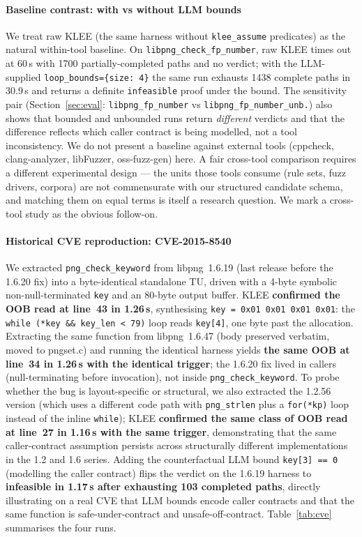 \documentclass[3p,times,procedia]{elsarticle}
\begin{document}
\paragraph{Baseline contrast: with vs without LLM bounds} We treat raw KLEE (the same harness without \texttt{klee\_assume} predicates) as the natural within-tool baseline. On \texttt{libpng\_check\_fp\_number}, raw KLEE times out at 60\,s with 1700 partially-completed paths and no verdict; with the LLM-supplied \texttt{loop\_bounds=\{size: 4\}} the same run exhausts 1438 complete paths in 30.9\,s and returns a definite \texttt{infeasible} proof under the bound. The sensitivity pair (Section~\ref{sec:eval}: \texttt{libpng\_fp\_number} vs \texttt{libpng\_fp\_number\_unb.}) also shows that bounded and unbounded runs return \emph{different} verdicts and that the difference reflects which caller contract is being modelled, not a tool inconsistency. We do not present a baseline against external tools (cppcheck, clang-analyzer, libFuzzer, oss-fuzz-gen) here. A fair cross-tool comparison requires a different experimental design --- the units those tools consume (rule sets, fuzz drivers, corpora) are not commensurate with our structured candidate schema, and matching them on equal terms is itself a research question. We mark a cross-tool study as the obvious follow-on.

\paragraph{Historical CVE reproduction: CVE-2015-8540 \cite{cve20158540}} We extracted \texttt{png\_check\_keyword} from libpng~1.6.19 (last release before the 1.6.20 fix) into a byte-identical standalone TU, driven with a 4-byte symbolic non-null-terminated \texttt{key} and an 80-byte output buffer. KLEE \textbf{confirmed the OOB read at line~43 in 1.26\,s}, synthesising \texttt{key = 0x01\,0x01\,0x01\,0x01}: the \texttt{while (*key \&\& key\_len < 79)} loop reads \texttt{key[4]}, one byte past the allocation. Extracting the same function from libpng~1.6.47 (body preserved verbatim, moved to pngset.c) and running the identical harness yields \textbf{the same OOB at line~34 in 1.26\,s with the identical trigger}; the 1.6.20 fix lived in callers (null-terminating before invocation), not inside \texttt{png\_check\_keyword}. To probe whether the bug is layout-specific or structural, we also extracted the 1.2.56 version (which uses a different code path with \texttt{png\_strlen} plus a \texttt{for(*kp)} loop instead of the inline \texttt{while}); KLEE \textbf{confirmed the same class of OOB read at line~27 in 1.16\,s with the same trigger}, demonstrating that the same caller-contract assumption persists across structurally different implementations in the 1.2 and 1.6 series. Adding the counterfactual LLM bound \texttt{key[3] == 0} (modelling the caller contract) flips the verdict on the 1.6.19 harness to \textbf{infeasible in 1.17\,s after exhausting 103 completed paths}, directly illustrating on a real CVE that LLM bounds encode caller contracts and that the same function is safe-under-contract and unsafe-off-contract. Table~\ref{tab:cve} summarises the four runs.
\end{document}
